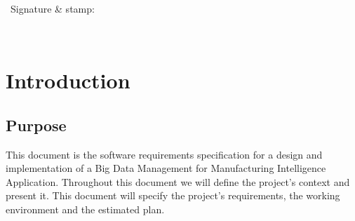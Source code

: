 \documentclass[a4paper]{report}
\newcommand{\answerbox}[1][3\baselineskip]{%
    \noindent\framebox[\linewidth]{%
        \raisebox{0pt}[0pt][#1]{}%
    }\par\medskip%
}
\begin{document}
\newcommand{\HRule}{\rule{\linewidth}{1mm}}




~\\
~\\
~\\
~\\
~\\
~\\
~\\
~\\


\begin{center}
~\Large{Signature \& stamp:} \\
\answerbox[18\baselineskip]
\end{center}

\thispagestyle{empty}


\newpage
\large
\thispagestyle{empty}
%
\thispagestyle{empty}
%
\renewcommand{\headrulewidth}{1pt}
\chead{} 
\renewcommand{\footrulewidth}{1pt}
\cfoot{}
\rfoot{\thepage}
\Large
\tableofcontents





\renewcommand{\arraystretch}{1.5}


~

\thispagestyle{empty}
\setcounter{page}{0}
\newpage

\renewcommand{\labelitemi}{$\bullet$}
\renewcommand{\labelitemii}{$\circ$}
\chapter{Introduction}
\section{Purpose}

This document is the software requirements specification for a design and implementation of
a Big Data Management for Manufacturing Intelligence Application. Throughout this document we will define the project's context and present it.
This document will specify the project's requirements, the working environment and the estimated plan.
\end{document}
